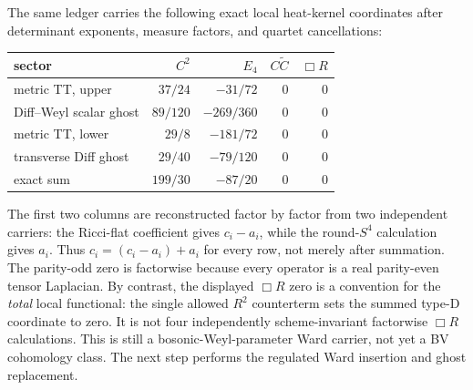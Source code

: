 \documentclass[11pt]{article}
\theoremstyle{definition}
\theoremstyle{remark}
\begin{document}
The same ledger carries the following exact local heat-kernel coordinates
after determinant exponents, measure factors, and quartet cancellations:
\begin{center}
\small
\begin{tabular}{@{}lrrrr@{}}
\toprule
sector & $C^2$ & $E_4$ & $C\widetilde C$ & $\Box R$\\
\midrule
metric TT, upper & $37/24$ & $-31/72$ & $0$ & $0$\\
Diff--Weyl scalar ghost & $89/120$ & $-269/360$ & $0$ & $0$\\
metric TT, lower & $29/8$ & $-181/72$ & $0$ & $0$\\
transverse Diff ghost & $29/40$ & $-79/120$ & $0$ & $0$\\
\midrule
exact sum & $199/30$ & $-87/20$ & $0$ & $0$\\
\bottomrule
\end{tabular}
\end{center}
The first two columns are reconstructed factor by factor from two independent
carriers: the Ricci-flat coefficient gives $c_i-a_i$, while the round-$S^4$
calculation gives $a_i$.  Thus $c_i=(c_i-a_i)+a_i$ for every row, not merely
after summation.  The parity-odd zero is factorwise because every operator is
a real parity-even tensor Laplacian.  By contrast, the displayed $\Box R$
zero is a convention for the \emph{total} local functional: the single
allowed $R^2$ counterterm sets the summed type-D coordinate to zero.  It is
not four independently scheme-invariant factorwise $\Box R$ calculations.
This is still a bosonic-Weyl-parameter Ward carrier, not yet a BV cohomology
class.  The next step performs the regulated Ward insertion and ghost
replacement.
\end{document}
